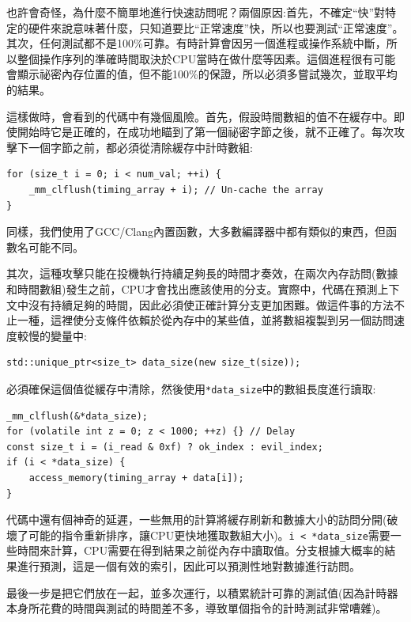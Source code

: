 也許會奇怪，為什麼不簡單地進行快速訪問呢？兩個原因:首先，不確定“快”對特定的硬件來說意味著什麼，只知道要比“正常速度”快，所以也要測試“正常速度”。其次，任何測試都不是100\%可靠。有時計算會因另一個進程或操作系統中斷，所以整個操作序列的準確時間取決於CPU當時在做什麼等因素。這個進程很有可能會顯示祕密內存位置的值，但不能100\%的保證，所以必須多嘗試幾次，並取平均的結果。

這樣做時，會看到的代碼中有幾個風險。首先，假設時間數組的值不在緩存中。即使開始時它是正確的，在成功地瞄到了第一個祕密字節之後，就不正確了。每次攻擊下一個字節之前，都必須從清除緩存中計時數組:

\begin{lstlisting}[style=styleCXX]
for (size_t i = 0; i < num_val; ++i) {
	_mm_clflush(timing_array + i); // Un-cache the array
}
\end{lstlisting}

同樣，我們使用了GCC/Clang內置函數，大多數編譯器中都有類似的東西，但函數名可能不同。

其次，這種攻擊只能在投機執行持續足夠長的時間才奏效，在兩次內存訪問(數據和時間數組)發生之前，CPU才會找出應該使用的分支。實際中，代碼在預測上下文中沒有持續足夠的時間，因此必須使正確計算分支更加困難。做這件事的方法不止一種，這裡使分支條件依賴於從內存中的某些值，並將數組複製到另一個訪問速度較慢的變量中:

\begin{lstlisting}[style=styleCXX]
std::unique_ptr<size_t> data_size(new size_t(size));
\end{lstlisting}

必須確保這個值從緩存中清除，然後使用\texttt{*data\_size}中的數組長度進行讀取:

\begin{lstlisting}[style=styleCXX]
_mm_clflush(&*data_size);
for (volatile int z = 0; z < 1000; ++z) {} // Delay
const size_t i = (i_read & 0xf) ? ok_index : evil_index;
if (i < *data_size) {
	access_memory(timing_array + data[i]);
}
\end{lstlisting}

代碼中還有個神奇的延遲，一些無用的計算將緩存刷新和數據大小的訪問分開(破壞了可能的指令重新排序，讓CPU更快地獲取數組大小)。\texttt{i < *data\_size}需要一些時間來計算，CPU需要在得到結果之前從內存中讀取值。分支根據大概率的結果進行預測，這是一個有效的索引，因此可以預測性地對數據進行訪問。


最後一步是把它們放在一起，並多次運行，以積累統計可靠的測試值(因為計時器本身所花費的時間與測試的時間差不多，導致單個指令的計時測試非常嘈雜)。

